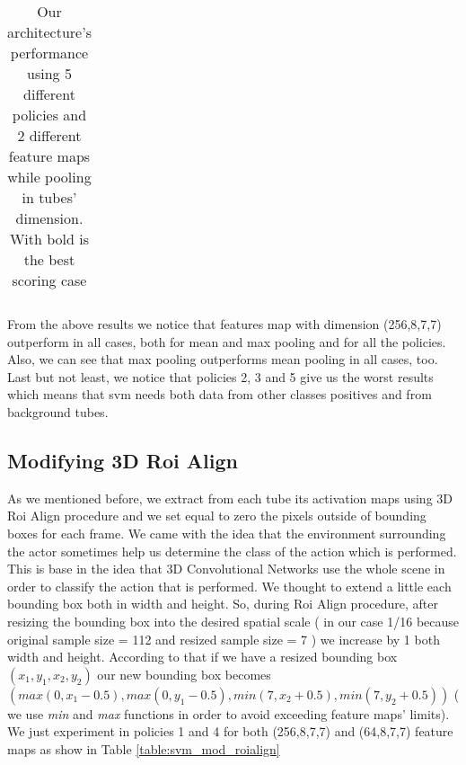 \begin{center}
\begin{longtable}{||c | c | c| c||c c c||}
  \caption{Our architecture's performance using 5 different policies and 2 different feature maps while pooling in
  tubes' dimension. With bold is the best scoring case}
  \label{table:svm_first_results}

\end{longtable} 
\end{center}

From the above results we notice that features map with dimension (256,8,7,7) outperform in all cases, both for mean and max pooling and
for all the policies. Also, we can see that max pooling outperforms mean pooling in all cases, too. Last but not least, we notice that policies
2, 3 and 5 give us the worst results which means that svm needs both data from other classes positives and from background tubes. 

\subsection{Modifying 3D Roi Align}
As we mentioned before, we extract from each tube its activation maps using 3D Roi Align procedure and we set equal to zero the pixels outside
of bounding boxes for each frame. We came with the idea that the environment surrounding the actor sometimes help us determine the class
of the action which is performed. This is base in the idea that 3D Convolutional Networks use the whole scene in order to classify the action
that is performed. We thought to extend a little each bounding box both in width and height. So, during Roi Align procedure, after resizing
the bounding box into the desired spatial scale  ( in our case 1/16 because original sample size = 112 and resized sample size = 7 )
we increase by 1 both width and height. According to that if we have a resized bounding box $( x_1,y_1,x_2,y_2) $ our new bounding box becomes
$ (max(0,x_1-0.5),max(0,y_1-0.5),min(7,x_2+0.5),min(7,y_2+0.5)) $ ( we use \textit{ min} and \textit{max} functions in order to avoid exceeding feature maps' limits).
We just experiment in policies 1 and 4 for both (256,8,7,7) and (64,8,7,7) feature maps as show in  Table \ref{table:svm_mod_roialign}


